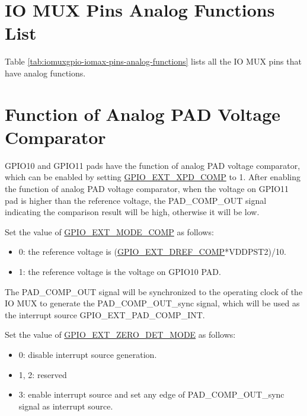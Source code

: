 \documentclass[main\_\_EN.tex]{subfiles}
\begin{document}


\section{IO MUX Pins Analog Functions List}
\label{sec:iomux_pins}

Table \ref{tab:iomuxgpio-iomax-pins-analog-functions} lists all the IO MUX pins that have analog functions.



\section{Function of Analog PAD Voltage Comparator}
\label{sec:zcd_pads}




GPIO10 and GPIO11 pads have the function of analog PAD voltage comparator, which can be enabled by setting \hyperref[fielddesc:GPIOSDXPDCOMP]{GPIO\_EXT\_XPD\_COMP} to 1. After enabling the function of analog PAD voltage comparator, when the voltage on GPIO11 pad is higher than the reference voltage, the PAD\_COMP\_OUT signal indicating the comparison result will be high, otherwise it will be low.

Set the value of \hyperref[fielddesc:GPIOSDMODECOMP]{GPIO\_EXT\_MODE\_COMP} as follows:
\begin{itemize}
    \item 0: the reference voltage is (\hyperref[fielddesc:GPIOSDDREFCOMP]{GPIO\_EXT\_DREF\_COMP}*VDDPST2)/10.
    \item 1: the reference voltage is the voltage on GPIO10 PAD.
\end{itemize}

The PAD\_COMP\_OUT signal will be synchronized to the operating clock of the IO MUX to generate the PAD\_COMP\_OUT\_sync signal, which will be used as the interrupt source GPIO\_EXT\_PAD\_COMP\_INT.

Set the value of \hyperref[fielddesc:GPIOSDZERODETMODE]{GPIO\_EXT\_ZERO\_DET\_MODE} as follows:

\begin{itemize}
    \item 0: disable interrupt source generation.
    \item 1, 2: reserved
    \item 3: enable interrupt source and set any edge of PAD\_COMP\_OUT\_sync signal as interrupt source.
\end{itemize}
\end{document}
